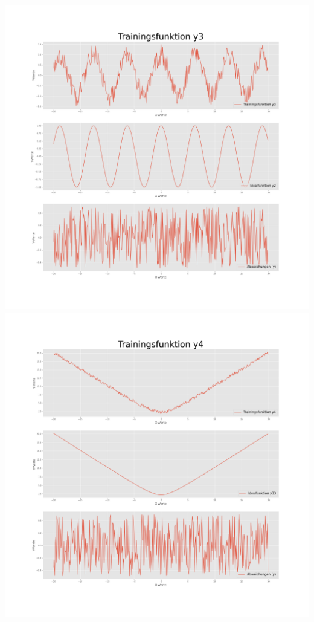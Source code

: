 \documentclass[
    a4paper, 								%
    oneside, 								%
    11pt, 									%
    listof=totoc, 					%
    bibliography=totoc, 		%
    final, 									%
    numbers=noenddot
]{scrreprt}
\begin{document}
\newpage
\includegraphics[width=1\textwidth]{Trainingsfunktiony3}
\newpage
\includegraphics[width=1\textwidth]{Trainingsfunktiony4}
\end{document}
